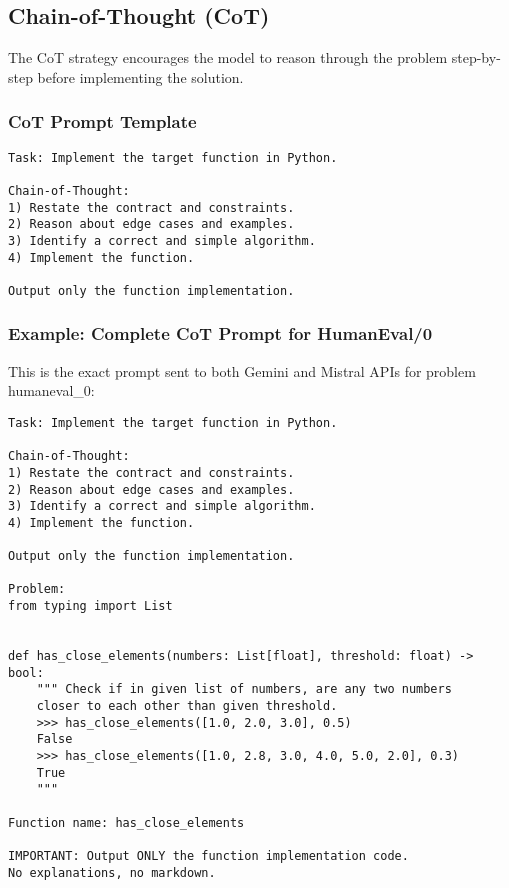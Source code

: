 \documentclass[11pt]{article}
\begin{document}
\subsection{Chain-of-Thought (CoT)}

The CoT strategy encourages the model to reason through the problem step-by-step before implementing the solution.

\subsubsection{CoT Prompt Template}

\begin{lstlisting}[caption=CoT Generic Template (from cot\_generic.txt)]
Task: Implement the target function in Python.

Chain-of-Thought:
1) Restate the contract and constraints.
2) Reason about edge cases and examples.
3) Identify a correct and simple algorithm.
4) Implement the function.

Output only the function implementation.
\end{lstlisting}

\subsubsection{Example: Complete CoT Prompt for HumanEval/0}

This is the exact prompt sent to both Gemini and Mistral APIs for problem humaneval\_0:

\begin{lstlisting}[caption=Complete CoT Prompt - HumanEval/0]
Task: Implement the target function in Python.

Chain-of-Thought:
1) Restate the contract and constraints.
2) Reason about edge cases and examples.
3) Identify a correct and simple algorithm.
4) Implement the function.

Output only the function implementation.

Problem:
from typing import List


def has_close_elements(numbers: List[float], threshold: float) -> bool:
    """ Check if in given list of numbers, are any two numbers 
    closer to each other than given threshold.
    >>> has_close_elements([1.0, 2.0, 3.0], 0.5)
    False
    >>> has_close_elements([1.0, 2.8, 3.0, 4.0, 5.0, 2.0], 0.3)
    True
    """

Function name: has_close_elements

IMPORTANT: Output ONLY the function implementation code. 
No explanations, no markdown.
\end{lstlisting}
\end{document}
